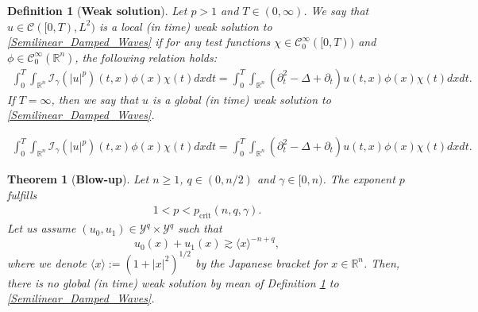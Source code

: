 \documentclass[10pt,a4paper]{amsart}
\newtheorem{definition}{Definition}
\newtheorem{theorem}{Theorem}
\begin{document}
\begin{definition}[\textbf{Weak solution}] \label{weak_def}
Let $p > 1$ and $T \in (0, \infty)$. We say that $u \in \mathcal{C}([0,T), L^2)$ is a local (in time) weak solution to \eqref{Semilinear_Damped_Waves} if  for any test functions $\chi \in \mathcal{C}_0^\infty([0,T))$ and $\phi \in \mathcal{C}_0^{\infty}(\mathbb{R}^n)$,  the following relation holds: 
\begin{align}
\int_0^{T}\int_{ \mathbb{R}^n}\mathcal{I}_{\gamma} (|u|^p)(t,x)\phi(x)\chi(t)dxdt = \int_0^{T}\int_{ \mathbb{R}^n}(\partial_t^2-\Delta+\partial_t)u(t,x)\phi(x)\chi(t)dxdt. \label{eqweak}
\end{align}
If $T = \infty$, then we say that $u$ is a global (in time) weak solution to \eqref{Semilinear_Damped_Waves}.
\end{definition}

\begin{align}
\int_0^{T}\int_{ \mathbb{R}^n}\mathcal{I}_{\gamma} (|u|^p)(t,x)\phi(x)\chi(t)dxdt = \int_0^{T}\int_{ \mathbb{R}^n}(\partial_t^2-\Delta+\partial_t)u(t,x)\phi(x)\chi(t)dxdt. 
\end{align}

\begin{theorem}[\textbf{Blow-up}] \label{Thm_Blow_up}
Let $n \geq 1$, $q \in (0, n/2)$ and $\gamma\in [0,n)$. The exponent $p$ fulfills
\begin{align}
1<p<p_{\mathrm{crit}}(n, q, \gamma). \label{condition-Blowup}
\end{align}
Let us assume $\left(u_0,u_1\right)\in \mathcal{Y}^q\times\mathcal{Y}^q$ such that
\begin{equation} \label{assumption_initial_data}
u_0(x)+u_1(x)\gtrsim\langle x\rangle^{-n+q},
\end{equation}
where we denote $\langle x\rangle:= \left(1+|x|^2\right)^{1/2}$ by the Japanese bracket for $x \in \mathbb{R}^n$. Then, there is no global (in time) weak solution by mean of Definition \ref{weak_def} to \eqref{Semilinear_Damped_Waves}.
\end{theorem}
\end{document}
